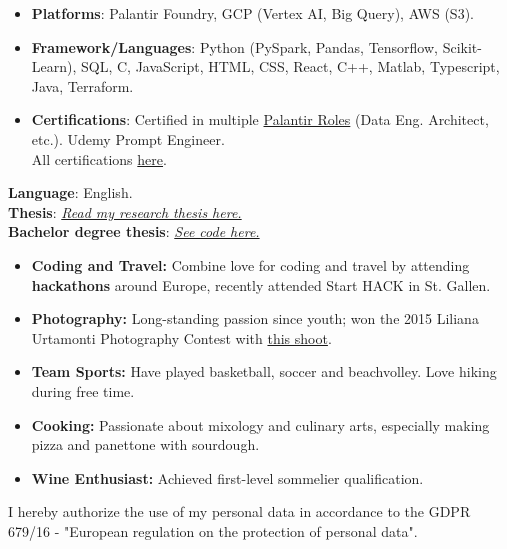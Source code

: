 \begin{itemize}
  \item \textbf{Platforms}: Palantir Foundry, GCP (Vertex AI, Big Query), AWS (S3).
  \item \textbf{Framework/Languages}: Python (PySpark, Pandas, Tensorflow, Scikit-Learn), SQL, C, JavaScript, HTML, CSS, React, C++, Matlab, Typescript, Java, Terraform.
  \item \textbf{Certifications}: 
  Certified in multiple \href{}{Palantir Roles} (Data Eng. Architect, etc.).
  Udemy Prompt Engineer.
  \\All certifications \href{https://mmarini.it/resume#certifications}{here}.
\end{itemize}


\textbf{Language}: English.\\
\textbf{Thesis}: \textit{\href{https://www.politesi.polimi.it/handle/10589/204539}{Read my research thesis here.}}\\
\textbf{Bachelor degree thesis}: \textit{\href{https://github.com/lentinip/ing-sw-2019-Lentini-Marazzi-Marini}{See code here.}}






\begin{itemize}
    \item \textbf{Coding and Travel:} Combine love for coding and travel by attending \textbf{hackathons} around Europe, recently attended Start HACK in St. Gallen.
    \item \textbf{Photography:} Long-standing passion since youth; won the 2015 Liliana Urtamonti Photography Contest with \href{https://www.instagram.com/p/1Ql0DrivyoekSE2An1JIdCRMaRkLcDW62WAho0/}{this shoot}.
    \item \textbf{Team Sports:} Have played basketball, soccer and beachvolley. Love hiking during free time.
    \item \textbf{Cooking:} Passionate about mixology and culinary arts, especially making pizza and panettone with sourdough.
    \item \textbf{Wine Enthusiast:} Achieved first-level sommelier qualification.
\end{itemize}

\divider

\footnotesize{I hereby authorize the use of my personal data in accordance to the GDPR 679/16 - "European regulation on the protection of personal data".}

